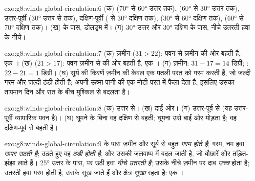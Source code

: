 \begin{solution}{exo:g8:winds-global-circulation:6}
(क)  (\ang{70} से \ang{60} उत्तर तक),  (\ang{60} से
\ang{30} उत्तर तक), उत्तर-पूर्वी  (\ang{30} उत्तर से  तक),
दक्षिण-पूर्वी  ( से \ang{30} दक्षिण तक), 
(\ang{30} से \ang{60} दक्षिण तक),  (\ang{60} से \ang{70}
दक्षिण तक)। (ख)  के पास, डोलड्रम में। (ग) \ang{30} उत्तर और
\ang{30} दक्षिण के पास, नीचे उतरती हवा के नीचे।
\end{solution}

\begin{solution}{exo:g8:winds-global-circulation:7}
(क) ज़मीन ($31 > 22$): पवन  से ज़मीन की ओर बहती है, एक ।
(ख)  ($21 > 17$): पवन ज़मीन से  की ओर बहती है, एक ।
(ग) ज़मीन: $31 - 17 = 14$ डिग्री; : $22 -
21 = 1$ डिग्री। (घ) सूर्य की किरणें
ज़मीन की केवल एक पतली परत को गरम करती हैं, जो जल्दी गरम और जल्दी ठंडी होती है; 
अपनी ऊष्मा पानी की एक मोटी परत में फैला देता है, इसलिए उसका तापमान दिन और रात के बीच
मुश्किल से बदलता है।
\end{solution}

\begin{solution}{exo:g8:winds-global-circulation:8}
(क) उत्तर से। (ख) दाईं ओर। (ग) उत्तर-पूर्व से (यह उत्तर-पूर्वी व्यापारिक पवन है)।
(घ) घूमने के बिना वह दक्षिण से बहती; घूमना उसे बाईं ओर मोड़ता है; वह दक्षिण-पूर्व से
बहती है।
\end{solution}

\begin{solution}{exo:g8:winds-global-circulation:9}
 के पास ज़मीन और  सूर्य से बहुत \emph{गरम होते हैं}; गरम, नम हवा
\emph{ऊपर उठती है}; उठते हुए वह \emph{ठंडी होती है}, और उसकी जलवाष्प
\emph{} में बदल जाती है, जो बौछारें और तड़ित-झंझा लाते हैं। \ang{25} उत्तर के
पास,  पर उठी हवा \emph{नीचे उतरती है}; उसके नीचे ज़मीन पर दाब
\emph{उच्च} होता है; उतरती हवा गरम होती है, उसके  सूख जाते हैं और क्षेत्र
\emph{सूखा} रहता है: एक ।
\end{solution}

